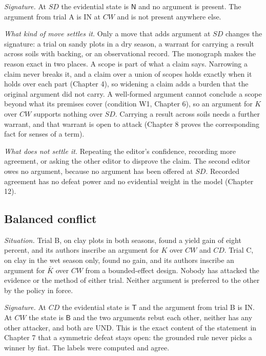 \documentclass[11pt]{article}
\newcommand{\IN}{\textsf{IN}}
\newcommand{\UND}{\textsf{UND}}
\begin{document}
\emph{Signature.} At $SD$ the evidential state is $\mathsf N$ and no argument is present. The argument from trial A is \IN{} at $CW$ and is not present anywhere else.

\emph{What kind of move settles it.} Only a move that adds argument at $SD$ changes the signature: a trial on sandy plots in a dry season, a warrant for carrying a result across soils with backing, or an observational record. The monograph makes the reason exact in two places. A scope is part of what a claim says. Narrowing a claim never breaks it, and a claim over a union of scopes holds exactly when it holds over each part (Chapter 4), so widening a claim adds a burden that the original argument did not carry. A well-formed argument cannot conclude a scope beyond what its premises cover (condition W1, Chapter 6), so an argument for $K$ over $CW$ supports nothing over $SD$. Carrying a result across soils needs a further warrant, and that warrant is open to attack (Chapter 8 proves the corresponding fact for senses of a term).

\emph{What does not settle it.} Repeating the editor's confidence, recording more agreement, or asking the other editor to disprove the claim. The second editor owes no argument, because no argument has been offered at $SD$. Recorded agreement has no defeat power and no evidential weight in the model (Chapter 12).

\subsection{Balanced conflict}

\emph{Situation.} Trial B, on clay plots in both seasons, found a yield gain of eight percent, and its authors inscribe an argument for $K$ over $CW$ and $CD$. Trial C, on clay in the wet season only, found no gain, and its authors inscribe an argument for $\bar K$ over $CW$ from a bounded-effect design. Nobody has attacked the evidence or the method of either trial. Neither argument is preferred to the other by the policy in force.

\emph{Signature.} At $CD$ the evidential state is $\mathsf T$ and the argument from trial B is \IN{}. At $CW$ the state is $\mathsf B$ and the two arguments rebut each other, neither has any other attacker, and both are \UND{}. This is the exact content of the statement in Chapter 7 that a symmetric defeat stays open: the grounded rule never picks a winner by fiat. The labels were computed and agree.
\end{document}
